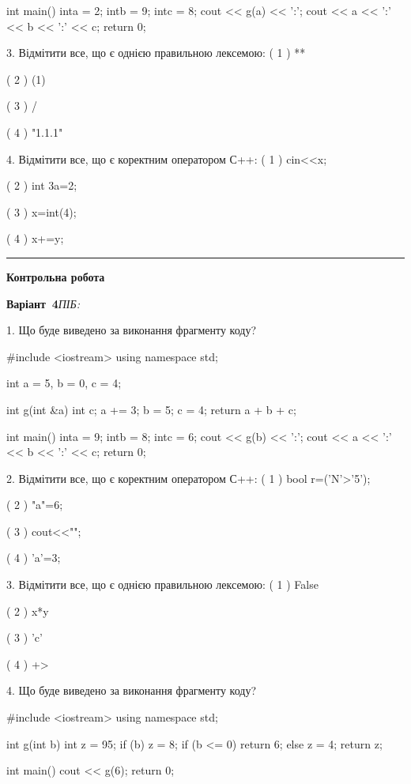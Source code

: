 \documentclass[11pt]{article}
\begin{document}
int main(){
    inta = 2;
    intb = 9;
    intc = 8;
    cout << g(a) << ':';
    cout << a << ':' << b << ':' << c;
    return 0; 
}

3. Відмітити все, що є однією правильною лексемою:
( 1 ) **

( 2 ) (1)

( 3 ) /

( 4 ) "1.1.1"

4. Відмітити все, що є коректним оператором С++:
( 1 ) cin<<x;

( 2 ) int 3a=2;

( 3 ) x=int(4);

( 4 ) x+=y;





\vspace{10mm}
\noindent\rule{\textwidth}{0.3pt}
\vspace{8mm}
{\large\textbf{Контрольна робота}}

\textbf{Варіант \No\,4}\hfill \textit{ПІБ:}\,\underline{\hspace{60mm}}
\vspace{4mm}

1. Що буде виведено за виконання фрагменту коду?

#include <iostream>
using namespace std;

int a = 5, b = 0, c = 4;

int g(int &a){
int c;    a += 3;
    b = 5;
    c = 4;
    return a + b + c;
}

int main(){
    inta = 9;
    intb = 8;
    intc = 6;
    cout << g(b) << ':';
    cout << a << ':' << b << ':' << c;
    return 0; 
}

2. Відмітити все, що є коректним оператором С++:
( 1 ) bool r=('N'>'5');

( 2 ) "a"=6;

( 3 ) cout<<"\n";

( 4 ) 'a'=3;

3. Відмітити все, що є однією правильною лексемою:
( 1 ) False

( 2 ) x*y

( 3 ) 'c'

( 4 ) +>

4. Що буде виведено за виконання фрагменту коду?

#include <iostream>
using namespace std;

int g(int b){
    int z = 95;
    if (b) 
        z = 8;
    if (b <= 0)
         return 6;
    else
         z = 4;
    return z;
}

int main(){
    cout << g(6);
    return 0;
}






\newpage
\end{document}
